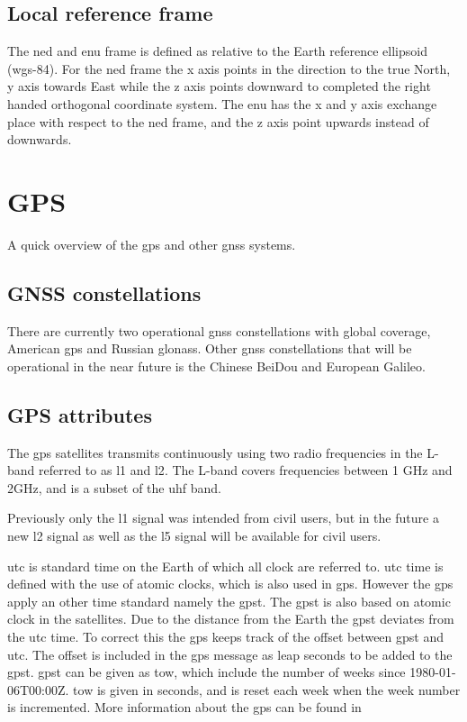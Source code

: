 \subsection{Local reference frame}
The \gls{ned} and \gls{enu} frame is defined as relative to the Earth reference ellipsoid (\gls{wgs-84}). For the \gls{ned} frame the x axis points in the direction to the true North, y axis towards East while the z axis points downward to completed the right handed orthogonal coordinate system. The \gls{enu} has the x and y axis exchange place with respect to the \gls{ned} frame, and the z axis point upwards instead of downwards.
\section{GPS}
A quick overview of the gps and other gnss systems.
\subsection{GNSS constellations}
There are currently two operational \gls{gnss} constellations with global coverage, American \gls{gps} and Russian \gls{glonass}. Other \gls{gnss} constellations that will be operational in the near future is the Chinese BeiDou and European Galileo.
\subsection{GPS attributes}
The \gls{gps} satellites transmits continuously using two radio frequencies in the L-band referred to as \gls{l1} and \gls{l2}. The L-band covers frequencies between 1 GHz and 2GHz, and is a subset of the \gls{uhf} band.

Previously only the \gls{l1} signal was intended from civil users, but in the future a new {l2} signal as well as the \gls{l5} signal will be available for civil users. 

\gls{utc} is standard time on the Earth of which all clock are referred to. \gls{utc} time is defined with the use of atomic clocks, which is also used in \gls{gps}. However the \gls{gps} apply an other time standard namely the \gls{gpst}. The \gls{gpst} is also based on atomic clock in the satellites. Due to the distance from the Earth the \gls{gpst} deviates from the \gls{utc} time. To correct this the \gls{gps} keeps track of the offset between \gls{gpst} and \gls{utc}. The offset is included in the \gls{gps} message as leap seconds to be added to the \gls{gpst}. \gls{gpst} can be given as \gls{tow}, which include the number of weeks since 1980-01-06T00:00Z. \gls{tow} is given in seconds, and is reset each week when the week number is incremented. More information about the \gls{gps} can be found in \citep{GPSBOOK,vik2014integrated} 

